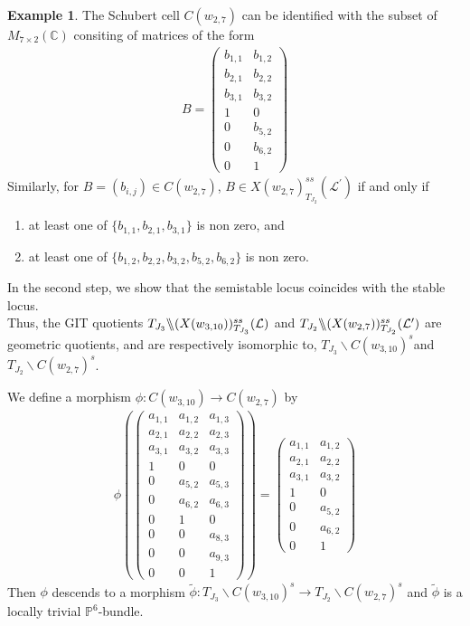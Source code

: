 \documentclass[12pt,reqno]{amsart}
\numberwithin{equation}{section}
\theoremstyle{definition}
\newtheorem{example}[theorem]{Example}
\newcommand{\GmodX}[3]{#1 \backslash\mkern-6mu\backslash #2^{ss}_{#1}(#3)}
\begin{document}
\begin{example}
The Schubert cell $C(w_{2,7})$ can be identified with the subset of $M_{7\times 2}(\mathbb{C})$ consiting of matrices of the form
\begin{align*}
	B=\begin{pmatrix}
		b_{1,1}&b_{1,2}\\
		b_{2,1}&b_{2,2}\\
		b_{3,1}&b_{3,2}\\
		1&0\\
		0&b_{5,2}\\
		0&b_{6,2}\\
		0&1
	\end{pmatrix}
\end{align*}
Similarly, for $B=(b_{i,j})\in C(w_{2,7})$, $B\in X(w_{2,7})^{ss}_{T_{J_{2}}}(\mathcal{L}^{\prime})$ if and only if 
\begin{enumerate}
	\item at least one of $\{b_{1,1},b_{2,1},b_{3,1}\}$ is non zero, and
	\item at least one of $\{b_{1,2},b_{2,2},b_{3,2},b_{5,2},b_{6,2}\}$ is non zero.
\end{enumerate}
In the second step, we show that the semistable locus coincides with the stable locus.\\ Thus, the GIT quotients  $\GmodX{T_{J_{3}}}{(X(w_{3,10}))}{\mathcal{L}}$ and $\GmodX{T_{J_{2}}}{(X(w_{2,7}))}{\mathcal{L}^{\prime}}$ are geometric quotients, and are respectively isomorphic to, $T_{J_{3}}\backslash C(w_{3,10})^{s}$and  $T_{J_{2}}\backslash C(w_{2,7})^{s}$.

We define a morphism $\phi:C(w_{3,10})\longrightarrow C(w_{2,7})$ by
\begin{align*}
	\phi(\begin{pmatrix}
		a_{1,1}&a_{1,2}&a_{1,3}\\
		a_{2,1}&a_{2,2}&a_{2,3}\\
		a_{3,1}&a_{3,2}&a_{3,3}\\
		1&0&0\\
		0&a_{5,2}&a_{5,3}\\
		0&a_{6,2}&a_{6,3}\\
		0&1&0\\
		0&0&a_{8,3}\\
		0&0&a_{9,3}\\
		0&0&1
	\end{pmatrix})=\begin{pmatrix}
	a_{1,1}&a_{1,2}\\
	a_{2,1}&a_{2,2}\\
	a_{3,1}&a_{3,2}\\
	1&0\\
	0&a_{5,2}\\
	0&a_{6,2}\\
	0&1
\end{pmatrix}
\end{align*}
Then $\phi$ descends to a morphism $\tilde{\phi}:T_{J_{3}}\backslash C(w_{3,10})^{s}\longrightarrow T_{J_{2}}\backslash C(w_{2,7})^{s}$ and  $\tilde{\phi}$ is a locally trivial $\mathbb{P}^{6}$-bundle.
\end{example}
\end{document}
